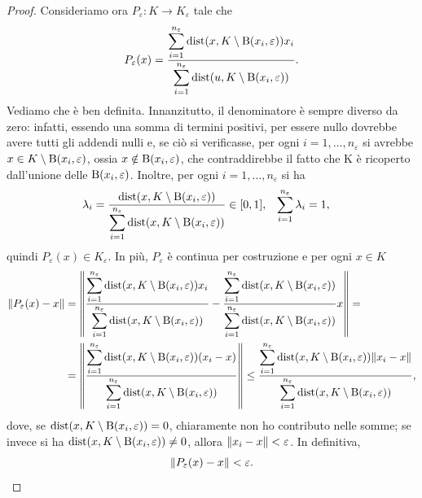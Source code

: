 \begin{proof}
	Consideriamo ora $P_\varepsilon : K \to K_\varepsilon$ tale che
	\[ P_\varepsilon(x) = \dfrac{\displaystyle \sum_{i=1}^{n_\varepsilon}\textup{dist}(x,K\setminus \B(x_i,\varepsilon))x_i}{\displaystyle\sum_{i=1}^{n_\varepsilon}\textup{dist}(u,K\setminus \B(x_i,\varepsilon))}. \]
	Vediamo che è ben definita. Innanzitutto, il denominatore è sempre diverso da zero: infatti, essendo una somma di termini positivi, per essere nullo dovrebbe avere tutti gli addendi nulli e, se ciò si verificasse, per ogni $i=1,\dots,n_\varepsilon$ si avrebbe $x \in K\setminus \B(x_i,\varepsilon)$, ossia $x \notin \B(x_i,\varepsilon)$, che contraddirebbe il fatto che K è ricoperto dall'unione delle $\B(x_i,\varepsilon)$. Inoltre, per ogni $i=1,\dots,n_\varepsilon$ si ha
	\begin{align*}
		\lambda_i = \dfrac{\textup{dist}(x,K\setminus \B(x_i,\varepsilon))}{\displaystyle\sum_{i=1}^{n_\varepsilon}\textup{dist}(x,K\setminus \B(x_i,\varepsilon))} &\in [0,1], & \sum_{i=1}^{n_{\varepsilon}}\lambda_i &= 1, 
	\end{align*}
	quindi $P_\varepsilon(x) \in K_\varepsilon$. In più, $P_\varepsilon$ è continua per costruzione e per ogni $x \in K$
	\begin{align*}
		\norm{P_\varepsilon(x)-x} &=  \norm*{\dfrac{\displaystyle \sum_{i=1}^{n_\varepsilon}\textup{dist}(x,K\setminus \B(x_i,\varepsilon))x_i}{\displaystyle\sum_{i=1}^{n_\varepsilon}\textup{dist}(x,K\setminus \B(x_i,\varepsilon))} - \dfrac{\displaystyle \sum_{i=1}^{n_\varepsilon}\textup{dist}(x,K\setminus \B(x_i,\varepsilon))}{\displaystyle\sum_{i=1}^{n_\varepsilon}\textup{dist}(x,K\setminus \B(x_i,\varepsilon))}x} = \\
		&= \norm*{\dfrac{\displaystyle \sum_{i=1}^{n_\varepsilon}\textup{dist}(x,K\setminus \B(x_i,\varepsilon))(x_i-x)}{\displaystyle\sum_{i=1}^{n_\varepsilon}\textup{dist}(x,K\setminus \B(x_i,\varepsilon))}} \le \dfrac{\displaystyle \sum_{i=1}^{n_\varepsilon}\textup{dist}(x,K\setminus \B(x_i,\varepsilon))\norm{x_i-x}}{\displaystyle\sum_{i=1}^{n_\varepsilon}\textup{dist}(x,K\setminus \B(x_i,\varepsilon))},
	\end{align*}
	dove, se $\textup{dist}(x,K\setminus \B(x_i,\varepsilon)) = 0$, chiaramente non ho contributo nelle somme; se invece si ha $\textup{dist}(x,K\setminus \B(x_i,\varepsilon)) \ne 0$, allora $\norm{x_i-x}<\varepsilon$. In definitiva,
	\begin{equation}\label{superimportanteperTychonoff}
		\norm{P_\varepsilon(x)-x} < \varepsilon.
	\end{equation}
	

\end{proof}
